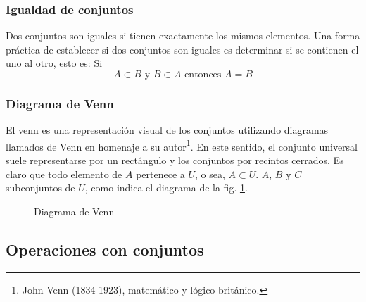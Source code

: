 \subsubsection{Igualdad de conjuntos}
\vspace{1em}
 
\begin{fmd-definition} \label{def:igualdad_conjuntos}
	Dos conjuntos son iguales si tienen exactamente los mismos elementos. Una forma práctica de establecer si dos conjuntos son iguales es determinar si se contienen el uno al otro, esto es:
	Si \[ A \subset B \mbox{ y } B \subset A \mbox{ entonces } A = B \]
\end{fmd-definition}

\subsubsection{Diagrama de Venn}

El \gls{venn} es una representación visual de los conjuntos utilizando diagramas llamados de Venn en homenaje a su autor\footnote{John Venn (1834-1923), matemático y lógico británico.}. En este sentido, el conjunto universal suele representarse por un rectángulo y los conjuntos por recintos cerrados. Es claro que todo elemento de $A$ pertenece a $U$, o sea, $A \subset U$. $A$, $B$ y $C$ subconjuntos de $U$, como indica el diagrama de la fig. \ref{fig:Venn}.

\begin{figure}[H]
	\centering
	\caption{Diagrama de Venn}
	\label{fig:Venn}
\end{figure}

\subsection{Operaciones con conjuntos}

